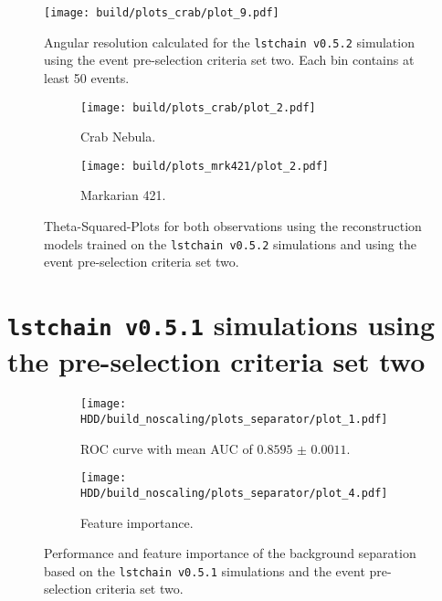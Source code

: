 \begin{figure}
    \centering
    \texttt{[image: build/plots\_crab/plot\_9.pdf]}
    \caption{Angular resolution calculated for the \texttt{lstchain v0.5.2} simulation using the event pre-selection criteria set two.
        Each bin contains at least 50 events.
    }
    \label{fig:ang_res_newMC_150}
\end{figure}

\begin{figure}
    \centering
    \begin{subfigure}{0.49\textwidth}
        \centering
        \texttt{[image: build/plots\_crab/plot\_2.pdf]}
        \caption{Crab Nebula.}
        \label{fig:crab_newMC_150}
    \end{subfigure}
    \hfill
    \begin{subfigure}{0.49\textwidth}
        \centering
        \texttt{[image: build/plots\_mrk421/plot\_2.pdf]}
        \caption{Markarian 421.}
        \label{fig:mrk_newMC_150}
    \end{subfigure}
    \caption{Theta-Squared-Plots for both observations using the reconstruction models trained on the \texttt{lstchain v0.5.2} simulations and using 
        the event pre-selection criteria set two.
    }
    \label{fig:obs_newMC_150}
\end{figure}



\section{\texttt{lstchain v0.5.1} simulations using the pre-selection criteria set two}
\begin{figure}
    \centering
    \begin{subfigure}{0.49\textwidth}
        \centering
        \texttt{[image: HDD/build\_noscaling/plots\_separator/plot\_1.pdf]}
        \caption{ROC curve with mean AUC of $\num{0.8595(11)}$.}
        \label{fig:separator_oldMC_150}
    \end{subfigure}
    \hfill
    \begin{subfigure}{0.49\textwidth}
        \centering
        \texttt{[image: HDD/build\_noscaling/plots\_separator/plot\_4.pdf]}
        \caption{Feature importance.}
        \label{fig:separator_oldMC_150_feature}
    \end{subfigure}
    \caption{Performance and feature importance of the background separation based on the \texttt{lstchain v0.5.1} simulations and the event pre-selection criteria set two.}
\end{figure}

